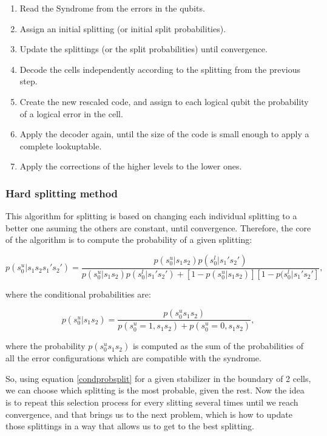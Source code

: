 \documentclass[a4paper,12pt]{article}
\begin{document}
\begin{enumerate}
\item Read the Syndrome from the errors in the qubits.
\item Assign an initial splitting (or initial split probabilities).
\item Update the splittings (or the split probabilities) until convergence.
\item Decode the cells independently according to the splitting from the previous step.
\item Create the new rescaled code, and assign to each logical qubit the probability of a logical error in the cell.
\item Apply the decoder again, until the size of the code is small enough to apply a complete lookuptable.
\item Apply the corrections of the higher levels to the lower ones.


\end{enumerate}

\subsubsection{Hard splitting method}
This algorithm for splitting is based on changing each individual splitting to a better one asuming the others are constant, until convergence. Therefore, the core of the algorithm is to compute the probability of a given splitting:

\begin{equation}
p(s_0^u|s_1s_2s_1's_2')=\frac{p(s_0^u|s_1s_2)p(s_0^l|s_1's_2')}{p(s_0^u|s_1s_2)p(s_0^l|s_1's_2')+[1-p(s_0^u|s_1s_2)][1-p(s_0^l|s_1's_2']},
\label{condprobsplit}
\end{equation}

where the conditional probabilities are:

\begin{equation}
p(s_0^u|s_1s_2)=\frac{p(s_0^us_1s_2)}{p(s_0^u=1,s_1s_2)+p(s_0^u=0,s_1s_2)},
\end{equation}

where the probability $p(s_0^us_1s_2)$ is computed as the sum of the probabilities of all the error configurations which are compatible with the syndrome.

So, using equation \ref{condprobsplit} for a given stabilizer in the boundary of 2 cells, we can choose which splitting is the most probable, given the rest. Now the idea is to repeat this selection process for every slitting several times until we reach convergence, and that brings us to the next problem, which is how to update those splittings in a way that allows us to get to the best splitting.
\end{document}

